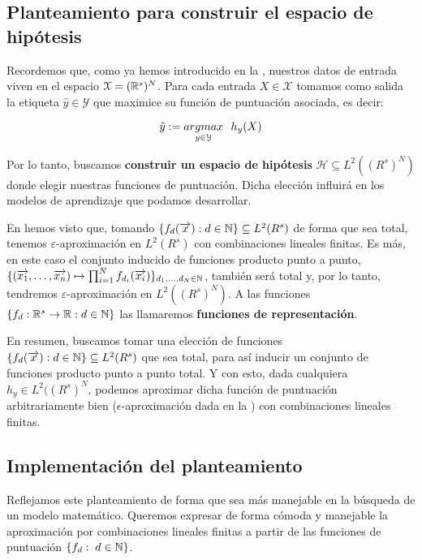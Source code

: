 \subsection{Planteamiento para construir el espacio de hipótesis} \label{sec:justificacion_func_repr}

Recordemos que, como ya hemos introducido en la , nuestros datos de entrada viven en el espacio $\mathcal{X} = (\mathbb{R}^s)^N$. Para cada entrada $X \in \mathcal{X}$ tomamos como salida la etiqueta $\hat{y} \in \mathcal{Y}$ que maximice su función de puntuación asociada, es decir:

\begin{equation}
	\hat{y} := \underset{y \in \mathcal{Y}}{argmax} \ \  h_y(X)
\end{equation}

Por lo tanto, buscamos \textbf{construir un espacio de hipótesis} $\mathcal{H} \subseteq L^2((R^s)^N)$ donde elegir nuestras funciones de puntuación. Dicha elección influirá en los modelos de aprendizaje que podamos desarrollar.

En  hemos visto que, tomando $\{f_d(\overrightarrow{x}): d \in \mathbb{N}\} \subseteq L^2(R^s)$ de forma que sea total, tenemos $\varepsilon$-aproximación en $L^2(R^s)$ con combinaciones lineales finitas. Es más, en este caso el conjunto inducido de funciones producto punto a punto, $\{(\overrightarrow{x_1}, \ldots, \overrightarrow{x_n}) \mapsto \prod_{i = 1}^N f_{d_i}(\overrightarrow{x_i}) \}_{d_1, \ldots, d_N \in \mathbb{N}}$, también será total y, por lo tanto, tendremos $\varepsilon$-aproximación en $L^2((R^s)^N)$. A las funciones $\{ f_d: \mathbb{R}^s \to \mathbb{R}: d \in \mathbb{N} \}$ las llamaremos \textbf{funciones de representación}.

En resumen, buscamos tomar una elección de funciones $\{f_d(\overrightarrow{x}): d \in \mathbb{N}\} \subseteq L^2(R^s)$ que sea total, para así inducir un conjunto de funciones producto punto a punto total. Y con esto, dada cualquiera $h_y \in L^2((R^s)^N$, podemos aproximar dicha función de puntuación arbitrariamente bien ($\epsilon$-aproximación dada en la ) con combinaciones lineales finitas.

\subsection{Implementación del planteamiento}

Reflejamos este planteamiento de forma que sea más manejable en la búsqueda de un modelo matemático. Queremos expresar de forma cómoda y manejable la aproximación por combinaciones lineales finitas a partir de las funciones de puntuación $\{ f_d: \; d \in \mathbb{N} \}$.

